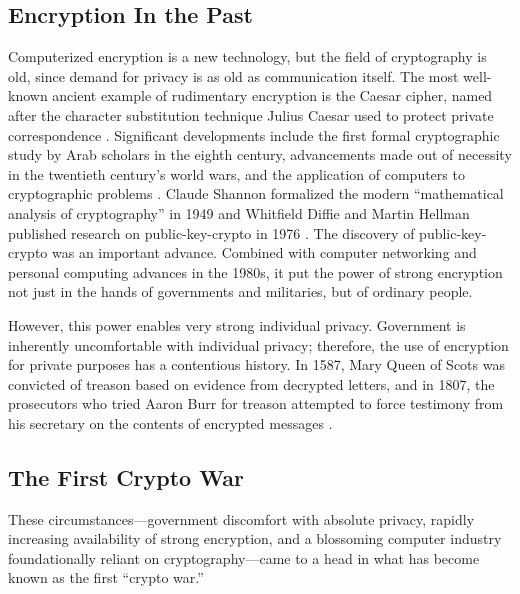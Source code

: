 \subsection{Encryption In the Past}
\label{sec-history-old}

Computerized encryption is a new technology, but the field of cryptography is old, since demand for privacy is as old as
communication itself. The most well-known ancient example of rudimentary encryption is the Caesar cipher, named after
the character substitution technique Julius Caesar used to protect private correspondence
\cite{luciano_cryptology_1987}. Significant developments include the first formal cryptographic study by Arab scholars
in the eighth century, advancements made out of necessity in the twentieth century's world wars, and the application of
computers to cryptographic problems \cite{kahn_codebreakers_1996}. Claude Shannon formalized the modern ``mathematical
analysis of cryptography'' in 1949 \cite{shannon_communication_1949} and Whitfield Diffie and Martin Hellman published
research on \ac{public-key-crypto} in 1976 \cite{diffie_new_1976}. The discovery of \ac{public-key-crypto} was an
important advance. Combined with computer networking and personal computing advances in the 1980s, it put the power of
strong encryption not just in the hands of governments and militaries, but of ordinary people.

However, this power enables very strong individual privacy. Government is inherently uncomfortable with individual
privacy; therefore, the use of encryption for private purposes has a contentious history. In 1587, Mary Queen of Scots
was convicted of treason based on evidence from decrypted letters, and in 1807, the prosecutors who tried Aaron Burr for
treason attempted to force testimony from his secretary on the contents of encrypted messages
\cite{kerr_encryption_2017}.

\subsection{The First Crypto War}
\label{sec-history-cw1}

These circumstances---government discomfort with absolute privacy, rapidly increasing availability of strong encryption,
and a blossoming computer industry foundationally reliant on cryptography---came to a head in what has become known as
the first ``crypto war.''

